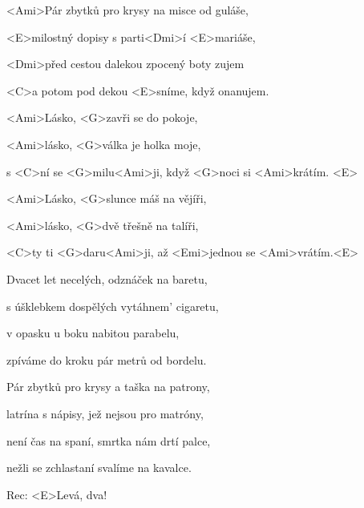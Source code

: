 

\zs
<Ami>Pár zbytků pro krysy na misce od guláše,

<E>milostný dopisy s parti<Dmi>í <E>mariáše,

<Dmi>před cestou dalekou zpocený boty zujem

<C>a potom pod dekou <E>sníme, když onanujem.
\ks

\zr
<Ami>Lásko, <G>zavři se do pokoje,

<Ami>lásko, <G>válka je holka moje,

s <C>ní se <G>milu<Ami>ji, když <G>noci si <Ami>krátím. <E>

<Ami>Lásko, <G>slunce máš na vějíři,

<Ami>lásko, <G>dvě třešně na talíři,

<C>ty ti <G>daru<Ami>ji, až <Emi>jednou se <Ami>vrátím.<E>
\kr

\zs
Dvacet let necelých, odznáček na baretu,

s úšklebkem dospělých vytáhnem' cigaretu,

v opasku u boku nabitou parabelu,

zpíváme do kroku pár metrů od bordelu.
\ks

\zr \kr

\zs
Pár zbytků pro krysy a taška na patrony,

latrína s nápisy, jež nejsou pro matróny,

není čas na spaní, smrtka nám drtí palce,

nežli se zchlastaní svalíme na kavalce.
\ks

\zr \kr

Rec: <E>Levá, dva!

\zr \kr

\kp





